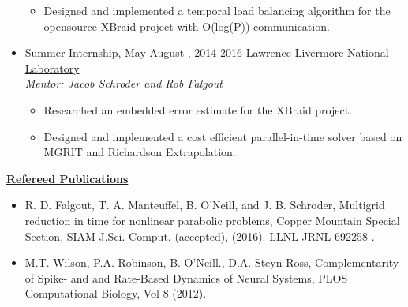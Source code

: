 \begin{itemize}
\begin{itemize}
\item Designed and implemented a temporal load balancing algorithm for the opensource XBraid project with O(log(P)) communication.
\end{itemize}
\item\underline{Summer Internship, May-August , 2014-2016 Lawrence Livermore National Laboratory}\\
{\em Mentor: Jacob Schroder and Rob Falgout}\\
\begin{itemize}
\item Researched an embedded error estimate for the XBraid project.
\item Designed and implemented a cost efficient parallel-in-time solver based on MGRIT and Richardson Extrapolation.
\end{itemize}
  \end{itemize}
  
{\bf {\underline{Refereed Publications }}}
\begin{itemize}
\setlength{\itemsep}{0.2pt}
\item R. D. Falgout, T. A. Manteuffel, B. O'Neill, and J. B. Schroder, Multigrid reduction in time for nonlinear parabolic problems, Copper Mountain Special Section, SIAM J.Sci. Comput. (accepted), (2016). LLNL-JRNL-692258 .
\item M.T. Wilson, P.A. Robinson, B. O'Neill., D.A. Steyn-Ross, Complementarity of Spike- and and Rate-Based Dynamics of Neural Systems, PLOS Computational Biology, Vol 8 (2012).
   \end{itemize}

